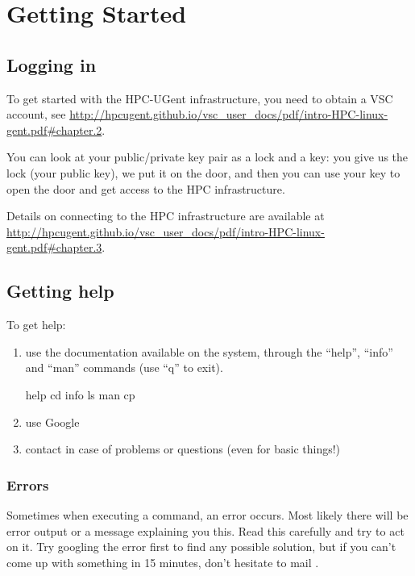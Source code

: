 \chapter{Getting Started}

\section{Logging in}

To get started with the HPC-UGent infrastructure, you need to obtain a VSC
account, see \url{http://hpcugent.github.io/vsc_user_docs/pdf/intro-HPC-linux-gent.pdf#chapter.2}.


You can look at your public/private key pair as a lock and a key: you give us
the lock (your public key), we put it on the door, and then you can use your
key to open the door and get access to the HPC infrastructure. 

Details on connecting to the HPC infrastructure are available at
\url{http://hpcugent.github.io/vsc_user_docs/pdf/intro-HPC-linux-gent.pdf#chapter.3}.

\section{Getting help}

To get help:

\begin{enumerate}
  \item use the documentation available on the system, through the ``help'',
    ``info'' and ``man'' commands (use ``q'' to exit).

\begin{prompt}
  help cd
  info ls
  man cp
\end{prompt}

  \item use Google
  \item contact \hpcinfo in case of problems or questions (even for basic
    things!)
\end{enumerate}

\subsection{Errors}

Sometimes when executing a command, an error occurs. Most likely there will be
error output or a message explaining you this. Read this carefully and try to
act on it. Try googling the error first to find any possible solution, but if
you can't come up with something in 15 minutes, don't hesitate to mail
\hpcinfo.


